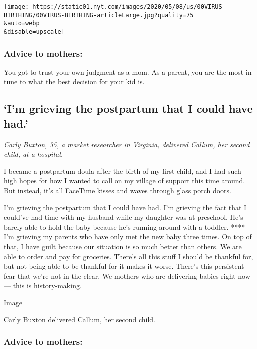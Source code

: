 \texttt{[image: https://static01.nyt.com/images/2020/05/08/us/00VIRUS-BIRTHING/00VIRUS-BIRTHING-articleLarge.jpg?quality=75\\\&auto=webp\\\&disable=upscale]}

\hypertarget{advice-to-mothers}{%
\subsubsection{\texorpdfstring{\textbf{Advice to
mothers:}}{Advice to mothers:}}\label{advice-to-mothers}}

You got to trust your own judgment as a mom. As a parent, you are the
most in tune to what the best decision for your kid is.

\hypertarget{im-grieving-the-postpartum-that-i-could-have-had}{%
\subsection{`I'm grieving the postpartum that I could have
had.'}\label{im-grieving-the-postpartum-that-i-could-have-had}}

\emph{Carly Buxton, 35, a market researcher in Virginia, delivered
Callum, her second child, at a hospital.}

I became a postpartum doula after the birth of my first child, and I had
such high hopes for how I wanted to call on my village of support this
time around. But instead, it's all FaceTime kisses and waves through
glass porch doors.

I'm grieving the postpartum that I could have had. I'm grieving the fact
that I could've had time with my husband while my daughter was at
preschool. He's barely able to hold the baby because he's running around
with a toddler. **** I'm grieving my parents who have only met the new
baby three times. On top of that, I have guilt because our situation is
so much better than others. We are able to order and pay for groceries.
There's all this stuff I should be thankful for, but not being able to
be thankful for it makes it worse. There's this persistent fear that
we're not in the clear. We mothers who are delivering babies right now
--- this is history-making.

Image

Carly Buxton delivered Callum, her second child.

\hypertarget{advice-to-mothers-1}{%
\subsubsection{\texorpdfstring{\textbf{Advice to
mothers:}}{Advice to mothers:}}\label{advice-to-mothers-1}}

